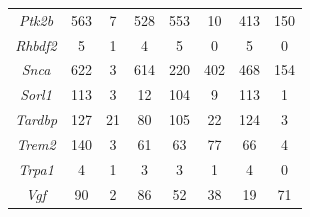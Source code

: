 \begin{table}[]
\begin{tabular}{@{}cccccccc@{}}
		\textit{Ptk2b}  & 563  & 7  & 528  & 553  & 10  & 413 & 150  \\
		\textit{Rhbdf2} & 5    & 1  & 4    & 5    & 0   & 5   & 0    \\
		\textit{Snca}   & 622  & 3  & 614  & 220  & 402 & 468 & 154  \\
		\textit{Sorl1}  & 113  & 3  & 12   & 104  & 9   & 113 & 1    \\
		\textit{Tardbp} & 127  & 21 & 80   & 105  & 22  & 124 & 3    \\
		\textit{Trem2}  & 140  & 3  & 61   & 63   & 77  & 66  & 4    \\
		\textit{Trpa1}  & 4    & 1  & 3    & 3    & 1   & 4   & 0    \\
		\textit{Vgf}    & 90   & 2  & 86   & 52   & 38  & 19  & 71   \\ \bottomrule
	\end{tabular}
\end{table}

